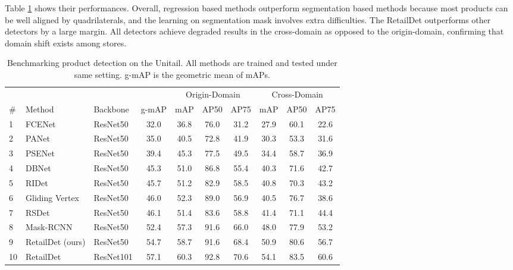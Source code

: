 \documentclass[runningheads]{llncs}
\begin{document}
Table \ref{tab:detection_benchmark} shows their performances. Overall, regression based methods outperform segmentation based methods because most products can be well aligned by quadrilaterals, and the learning on segmentation mask involves extra difficulties. The RetailDet outperforms other detectors by a large margin. All detectors achieve degraded results in the cross-domain as opposed to the origin-domain, confirming that domain shift exists among stores. %

\begin{table}
\centering
\caption{Benchmarking product detection on the Unitail. All methods are trained and tested under same setting. g-mAP is the geometric mean of mAPs. %
}
\begin{tabular}{ll|l|c|ccc|ccc}
\hline \hline
 &&&& \multicolumn{3}{c|}{Origin-Domain} & \multicolumn{3}{c}{Cross-Domain}\\
\#&Method                    & Backbone &g-mAP     & mAP  & AP50 & AP75   & mAP  & AP50 & AP75 \\ \hline
1&FCENet \cite{FCENet2021}   & ResNet50 &32.0      & 36.8 & 76.0 & 31.2   & 27.9 & 60.1 & 22.6 \\
2&PANet \cite{PANet2019}     & ResNet50 &35.0      & 40.5 & 72.8 & 41.9   & 30.3 & 53.3 & 31.6 \\
3&PSENet \cite{PSENet2019}   & ResNet50 &39.4      & 45.3 & 77.5 & 49.5   & 34.4 & 58.7 & 36.9 \\
4&DBNet \cite{DBNet2020}     & ResNet50 &45.3      & 51.0 & 86.8 & 55.4   & 40.3 & 71.6 & 42.7 \\
5&RIDet \cite{RIDet}         & ResNet50 &45.7      & 51.2 & 82.9 & 58.5   & 40.8 & 70.3 & 43.2 \\
6&Gliding Vertex\cite{xu2019gliding} & ResNet50 &46.0      & 52.3 & 89.0 & 56.9   & 40.5 & 76.7 & 38.6 \\
7&RSDet \cite{RSDet}         & ResNet50 &46.1      & 51.4 & 83.6 & 58.8   & 41.4 & 71.1 & 44.4 \\
8&Mask-RCNN \cite{he2017mask}& ResNet50 &52.4      & 57.3 & 91.6 & 66.0   & 48.0 & 77.9 & 53.2 \\ 
9&RetailDet (ours)    & ResNet50 &54.7      & 58.7 & 91.6 & 68.4   & 50.9 & 80.6 & 56.7 \\
10&RetailDet          & ResNet101&57.1      & 60.3 & 92.8 & 70.6   & 54.1 & 83.5 & 60.6 \\
\hline
\end{tabular}
\label{tab:detection_benchmark}
\end{table}
\end{document}
